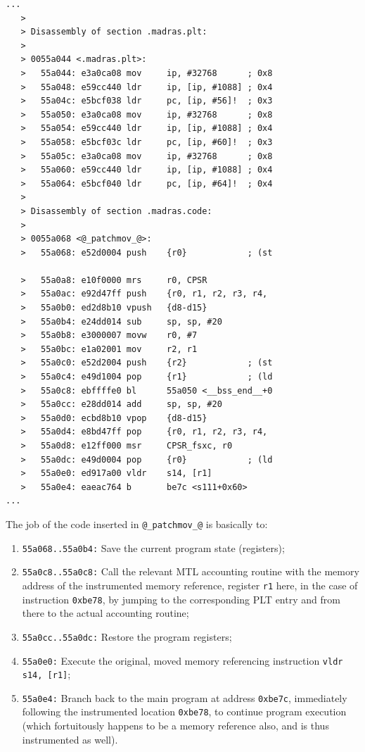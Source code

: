 \documentclass[11pt, a4paper, twoside]{montblanc2}
\begin{document}
\begin{footnotesize}
\begin{verbatim}
...
   >
   > Disassembly of section .madras.plt:
   >
   > 0055a044 <.madras.plt>:
   >   55a044: e3a0ca08 mov     ip, #32768      ; 0x8
   >   55a048: e59cc440 ldr     ip, [ip, #1088] ; 0x4
   >   55a04c: e5bcf038 ldr     pc, [ip, #56]!  ; 0x3
   >   55a050: e3a0ca08 mov     ip, #32768      ; 0x8
   >   55a054: e59cc440 ldr     ip, [ip, #1088] ; 0x4
   >   55a058: e5bcf03c ldr     pc, [ip, #60]!  ; 0x3
   >   55a05c: e3a0ca08 mov     ip, #32768      ; 0x8
   >   55a060: e59cc440 ldr     ip, [ip, #1088] ; 0x4
   >   55a064: e5bcf040 ldr     pc, [ip, #64]!  ; 0x4
   >
   > Disassembly of section .madras.code:
   >
   > 0055a068 <@_patchmov_@>:
   >   55a068: e52d0004 push    {r0}            ; (st

   >   55a0a8: e10f0000 mrs     r0, CPSR
   >   55a0ac: e92d47ff push    {r0, r1, r2, r3, r4, 
   >   55a0b0: ed2d8b10 vpush   {d8-d15}
   >   55a0b4: e24dd014 sub     sp, sp, #20
   >   55a0b8: e3000007 movw    r0, #7
   >   55a0bc: e1a02001 mov     r2, r1
   >   55a0c0: e52d2004 push    {r2}            ; (st
   >   55a0c4: e49d1004 pop     {r1}            ; (ld
   >   55a0c8: ebffffe0 bl      55a050 <__bss_end__+0
   >   55a0cc: e28dd014 add     sp, sp, #20
   >   55a0d0: ecbd8b10 vpop    {d8-d15}
   >   55a0d4: e8bd47ff pop     {r0, r1, r2, r3, r4, 
   >   55a0d8: e12ff000 msr     CPSR_fsxc, r0
   >   55a0dc: e49d0004 pop     {r0}            ; (ld
   >   55a0e0: ed917a00 vldr    s14, [r1]
   >   55a0e4: eaeac764 b       be7c <s111+0x60>
...
\end{verbatim}
\end{footnotesize}

The job of the code inserted in \verb|@_patchmov_@| is basically to:
\begin{enumerate}
\item \texttt{55a068..55a0b4:} Save the current program state (registers);
\item \texttt{55a0c8..55a0c8:} Call the relevant MTL accounting routine with the 
memory address of the instrumented memory reference, register \texttt{r1} here, 
in the case of instruction \texttt{0xbe78}, by jumping to the corresponding PLT 
entry and from there to the actual accounting routine;
\item \texttt{55a0cc..55a0dc:} Restore the program registers;
\item \texttt{55a0e0:} Execute the original, moved memory referencing 
instruction \verb|vldr s14, [r1]|;
\item \texttt{55a0e4:} Branch back to the main program at address 
  \texttt{0xbe7c}, immediately following the instrumented location 
  \texttt{0xbe78}, to continue program execution (which fortuitously happens to 
  be a memory reference also, and is thus instrumented as well).
\end{enumerate}
\end{document}
